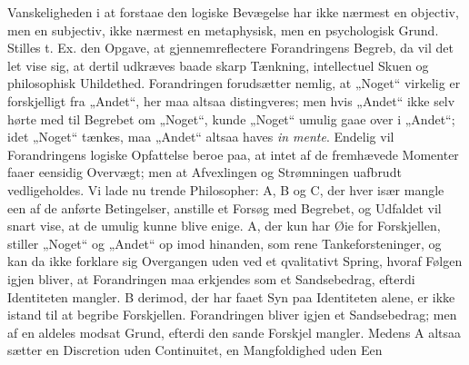 \documentclass[12pt]{book}
\newcommand{\opage}[1]{\marginnote{\footnotesize\textit{[#1]}}}
\begin{document}
Vanskeligheden i at forstaae den logiske Bevægelse har ikke nærmest en objectiv, men
en subjectiv, ikke nærmest en metaphysisk, men en psychologisk Grund. Stilles t. Ex.
den Opgave, at gjennemreflectere Forandringens Begreb, da vil det let vise sig, at
dertil udkræves baade skarp Tænkning, intellectuel Skuen og philosophisk Uhildethed.
Forandringen forudsætter nemlig, at „Noget“ virkelig er forskjelligt fra „Andet“, her
maa altsaa distingveres; men hvis „Andet“ ikke selv hørte med til Begrebet om
„Noget“, kunde „Noget“ umulig gaae over i „Andet“; idet „Noget“ tænkes, maa „Andet“
altsaa haves \textit{in mente}. Endelig vil Forandringens logiske Opfattelse beroe
paa, at intet af de fremhævede Momenter faaer eensidig Overvægt; men at Afvexlingen
og Strømningen uafbrudt vedligeholdes. Vi lade nu trende Philosopher: A, B og C, der
hver især mangle een af de anførte Betingelser, anstille et Forsøg med Begrebet, og
Udfaldet vil snart vise, at de umulig kunne blive enige. A, der kun har Øie for
Forskjellen, stiller „Noget“ og „Andet“ op imod hinanden, som rene Tankeforsteninger,
og kan da ikke forklare sig Overgangen uden ved et qvalitativt Spring, hvoraf Følgen
igjen bliver, at Forandringen maa erkjendes som et Sandsebedrag, efterdi Identiteten
mangler. B derimod, der har faaet Syn paa Identiteten alene, er ikke istand til at
begribe Forskjellen. Forandringen bliver igjen et Sandsebedrag; men af en aldeles
modsat Grund, efterdi den sande Forskjel mangler. Medens A altsaa sætter en Discretion
uden Continuitet, en Mangfoldighed uden Een%
\opage{110}%
\end{document}
